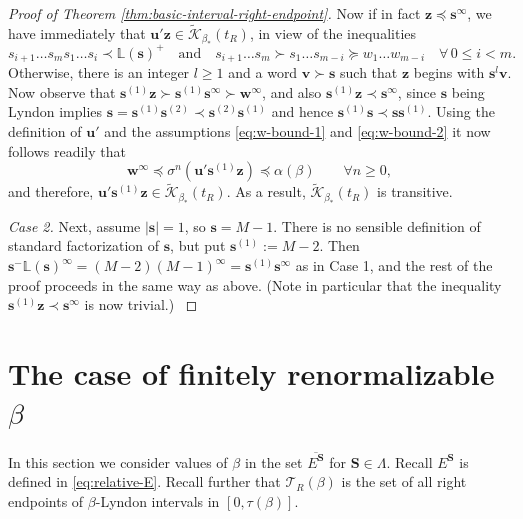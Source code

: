 \documentclass[11pt]{amsart}
\theoremstyle{definition}
\theoremstyle{remark}
\numberwithin{equation}{section}
\renewcommand{\L}{\ensuremath{\mathbb{L}}}
\newcommand{\Kt}{\widetilde{\mathcal{K}}}
\newcommand{\s}{ {\mathbf{s}}}
\newcommand{\cs}{ {\mathbf{S}}}
\renewcommand{\u}{\mathbf{u}}
\renewcommand{\v}{\mathbf{v}}
\newcommand{\w}{\mathbf{w}}
\newcommand{\z}{\mathbf{z}}
\newcommand{\f}{\infty}
\newcommand{\lle}{\preccurlyeq}
\newcommand{\lge}{\succcurlyeq}
\newcommand{\La}{\Lambda}
\begin{document}
\begin{proof}[Proof of Theorem \ref{thm:basic-interval-right-endpoint}]
Now if in fact $\z\lle \s^\f$, we have immediately that $\u'\z\in\Kt_{\beta_*}(t_R)$, in view of the inequalities
\[
s_{i+1}\ldots s_ms_1\ldots s_i\prec\L(\s)^+\quad \textrm{and}\quad s_{i+1}\ldots s_m\succ s_1\ldots s_{m-i}\lge w_1\ldots w_{m-i}\quad \forall\, 0\le i<m.
\]
Otherwise, there is an integer $l\geq 1$ and a word $\v\succ\s$ such that $\z$ begins with $\s^l\v$. Now observe that $\s^{(1)}\z\succ \s^{(1)}\s^\f\succ \w^\f$, and also $\s^{(1)}\z\prec \s^\f$, since $\s$ being Lyndon implies $\s=\s^{(1)}\s^{(2)}\prec \s^{(2)}\s^{(1)}$ and hence $\s^{(1)}\s\prec \s\s^{(1)}$. Using the definition of $\u'$ and the assumptions \eqref{eq:w-bound-1} and \eqref{eq:w-bound-2} it now follows readily that
\[
\w^\f \lle \sigma^n(\u'\s^{(1)}\z) \lle \alpha(\beta)\qquad\forall n\geq 0,
\]
and therefore, $\u'\s^{(1)}\z\in\Kt_{\beta_*}(t_R)$. As a result, $\Kt_{\beta_*}(t_R)$ is transitive.

{
\medskip
{\em Case 2.} Next, assume $|\s|=1$, so $\s=M-1$. There is no sensible definition of standard factorization of $\s$, but put $\s^{(1)}:=M-2$. Then $\s^-\L(\s)^\f=(M-2)(M-1)^\f=\s^{(1)}\s^\f$ as in Case 1, and the rest of the proof proceeds in the same way as above. (Note in particular that the inequality $\s^{(1)}\z\prec \s^\f$ is now trivial.)
}
\end{proof}
 

\section{The case of finitely renormalizable $\beta$} \label{sec:relative-exceptional}

In this section we consider values of $\beta$ in the set $\overline{E^\cs}$ for $\cs\in\La$. Recall $E^\cs$ is defined in \eqref{eq:relative-E}.
Recall further that $\mathcal{T}_R(\beta)$ is the set of all right endpoints of $\beta$-Lyndon intervals in $[0,\tau(\beta)]$.
\end{document}
